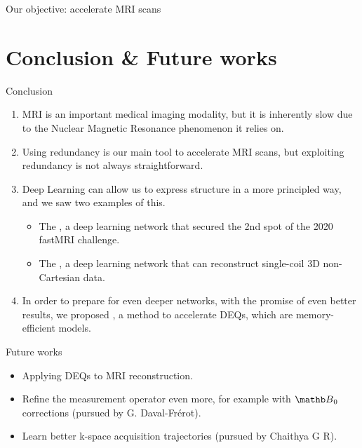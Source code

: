 \documentclass[aspectratio=169,xcolor=dvipsnames]{beamer}
\begin{document}
\begin{frame}{Our objective: accelerate MRI scans}
    \setlength{\parskip}{1ex}
    \begin{multicols}{2}
    \tableofcontents
    \end{multicols}
\end{frame}








% 



\section{Conclusion \& Future works}

\begin{frame}{Conclusion}
    \begin{enumerate}[<+->]
        \item MRI is an important medical imaging modality, but it is inherently slow due to the Nuclear Magnetic Resonance phenomenon it relies on.
        \item Using redundancy is our main tool to accelerate MRI scans, but exploiting redundancy is not always straightforward.
        \item Deep Learning can allow us to express structure in a more principled way, and we saw two examples of this.
        \begin{itemize}[<+->]
            \item The , a deep learning network that secured the 2nd spot of the 2020 fastMRI challenge.
            \item The , a deep learning network that can reconstruct single-coil 3D non-Cartesian data.
        \end{itemize}
        \item In order to prepare for even deeper networks, with the promise of even better results, we proposed , a method to accelerate DEQs, which are memory-efficient models.
    \end{enumerate}
\end{frame}

\begin{frame}{Future works}
    \begin{itemize}
        \item Applying DEQs to MRI reconstruction.
        \item Refine the measurement operator even more, for example with $\Bb_0$ corrections (pursued by G. Daval-Fr\'{e}rot).
        \item Learn better k-space acquisition trajectories (pursued by Chaithya G R).
    \end{itemize}
\end{frame}
\end{document}
